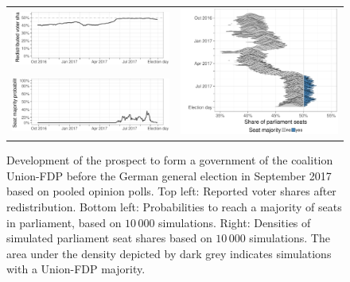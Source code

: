 \documentclass[smallcondensed]{svjour3}     %
\begin{document}
\begin{figure}[H]\centering
\begin{tabular}{ll}
\includegraphics[height=.15\textwidth]{figures/2017_pooled_cdufdp_rawSharesRedist.pdf}
&
\multirow{2}{*}[13ex]{\includegraphics[height=30ex]{figures/2017_pooled_cdufdp_ridgeline.pdf}}
\\
\includegraphics[height=.15\textwidth]{figures/2017_pooled_cdufdp_prob.pdf}
\end{tabular}
\caption{Development of the prospect to form a government of the coalition
Union-FDP before the German general election in September 2017 based on pooled
opinion polls.
Top left: Reported voter shares after redistribution.
Bottom left: Probabilities to reach a majority of seats in parliament, based on
$10\,000$ simulations.
Right: Densities of simulated parliament seat shares based on $10\,000$ simulations.
The area under the density depicted by dark grey indicates simulations with a
Union-FDP majority.
\label{fig:2017_cdufdp}
}
\end{figure}
\end{document}
